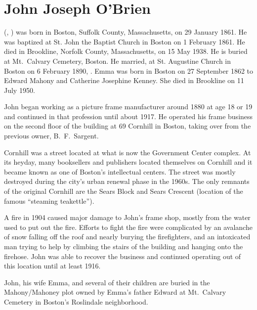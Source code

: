 \section{John Joseph O'Brien}

 (, ) was born in Boston, Suffolk County, Massachusetts, on 29 January 1861.\cite{John3OBrienBirth} He was baptized at St. John the Baptist Church in Boston on 1 February 1861.\cite{John3OBrienBaptism} He died in Brookline, Norfolk County, Massachusetts, on 15 May 1938.\cite{John3OBrienDeath} He is buried at Mt.\ Calvary Cemetery, Boston.\cite{John3OBrienBurial} He married, at St. Augustine Church in Boston on 6 February 1890, .\cite{John3OBrienMarriage,John3OBrienMarriage2} Emma was born in Boston on 27 September 1862 to Edward Mahony and Catherine Josephine Kenney.\cite{EmmaMahonyBaptism} She died in Brookline on 11 July 1950.\cite{EmmaMahonyDeath}

John began working as a picture frame manufacturer around 1880\cite{John3OBrien1880} at age 18 or 19 and continued in that profession until about 1917.\cite{John3OBrien1916} He operated his frame business on the second floor of the building at 69 Cornhill in Boston,\cite{John3OBrien1916,FrameShopFire} taking over from the previous owner, B.\ F.\ Sargent.\cite{PictureFrameLabel}

Cornhill was a street located at what is now the Government Center complex. At its heyday, many booksellers and publishers located themselves on Cornhill and it became known as one of Boston's intellectual centers.\cite{Cornhill} The street was mostly destroyed during the city's urban renewal phase in the 1960s. The only remnants of the original Cornhill are the Sears Block and Sears Crescent (location of the famous ``steaming teakettle'').\cite{Cornhill} 

A fire in 1904 caused major damage to John's frame shop, mostly from the water used to put out the fire. Efforts to fight the fire were complicated by an avalanche of snow falling off the roof and nearly burying the firefighters, and an intoxicated man trying to help by climbing the stairs of the building and hanging onto the firehose.\cite{FrameShopFire} John was able to recover the business and continued operating out of this location until at least 1916.\cite{John3OBrien1916}

John, his wife Emma, and several of their children are buried in the Mahony/Mahoney plot owned by Emma's father Edward at Mt.\ Calvary Cemetery in Boston's Roslindale neighborhood.\cite{John3OBrienBurial}

